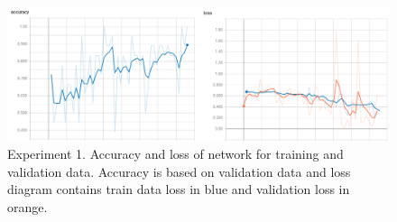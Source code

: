 \documentclass[a4paper,fleqn]{cas-dc}
\begin{document}
\begin{figure}
	\includegraphics[width=\linewidth]{images/tests_1}
	\caption{Experiment 1. Accuracy and loss of network for training and validation data. Accuracy is based on validation data and loss diagram contains train data loss in blue and validation loss in orange.}
	\label{fig:tests_1}
\end{figure}
\end{document}
